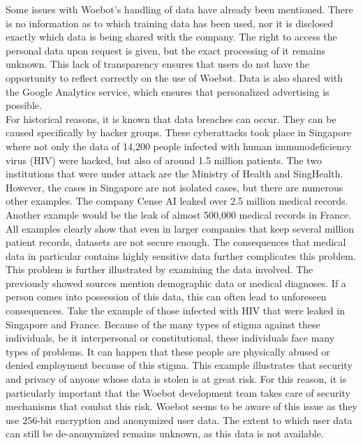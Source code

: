 Some issues with Woebot's handling of data have already been mentioned.
There is no information as to which training data has been used, nor it is disclosed exactly which data is being shared with the company.
The right to access the personal data upon request is given, but the exact processing of it remains unknown.
This lack of transparency ensures that users do not have the opportunity to reflect correctly on the use of Woebot.
Data is also shared with the Google Analytics service, which ensures that personalized advertising is possible\cite{woebot-privacy}.\\

For historical reasons, it is known that data breaches can occur.
They can be caused specifically by hacker groups.
These cyberattacks took place in Singapore where not only the data of 14,200 people infected with human immunodeficiency virus (HIV) were hacked, but also of around 1.5 million patients\cite{hiv-singapore}.
The two institutions that were under attack are the Ministry of Health and SingHealth.
However, the cases in Singapore are not isolated cases, but there are numerous other examples.
The company Cense AI leaked over 2.5 million medical records\cite{pcmag-leak}.
Another example would be the leak of almost 500,000 medical records in France\cite{france-leak}.
All examples clearly show that even in larger companies that keep several million patient records, datasets are not secure enough.
The consequences that medical data in particular contains highly sensitive data further complicates this problem.\\

This problem is further illustrated by examining the data involved.
The previously showed sources mention demographic data or medical diagnoses.
If a person comes into possession of this data, this can often lead to unforeseen consequences.
Take the example of those infected with HIV that were leaked in Singapore and France.
Because of the many types of stigma against these individuals, be it interpersonal or constitutional, these individuals face many types of problems\cite{stigma-hiv}.
It can happen that these people are physically abused or denied employment because of this stigma.
This example illustrates that security and privacy of anyone whose data is stolen is at great risk.
For this reason, it is particularly important that the Woebot development team takes care of security mechanisms that combat this risk.
Woebot seems to be aware of this issue as they use 256-bit encryption and anonymized user data\cite{woebot-security}.
The extent to which user data can still be de-anonymized remains unknown, as this data is not available.\\

